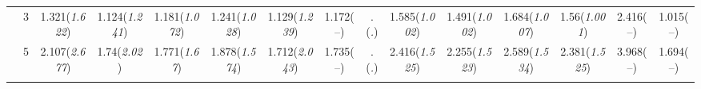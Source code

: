 \documentclass{article}
\begin{document}
\begin{table}[tbp]
{\begin{tabularx}{\textwidth}{lCCCCCCCCCCCCCC}
&3&1.321\newline (\emph{1.622})&1.124\newline (\emph{1.241})&1.181\newline (\emph{1.072})&1.241\newline (\emph{1.028})&1.129\newline (\emph{1.239})&1.172\newline (--)&.\newline (\emph{.})&1.585\newline (\emph{1.002})&1.491\newline (\emph{1.002})&1.684\newline (\emph{1.007})&1.56\newline (\emph{1.001})&2.416\newline (--)&1.015\newline (--) \tabularnewline
&5&2.107\newline (\emph{2.677})&1.74\newline (\emph{2.02})&1.771\newline (\emph{1.67})&1.878\newline (\emph{1.574})&1.712\newline (\emph{2.043})&1.735\newline (--)&.\newline (\emph{.})&2.416\newline (\emph{1.525})&2.255\newline (\emph{1.523})&2.589\newline (\emph{1.534})&2.381\newline (\emph{1.525})&3.968\newline (--)&1.694\newline (--) \tabularnewline
\bottomrule \addlinespace[1.5ex]

\end{tabularx}
}
\end{table}
\end{document}
